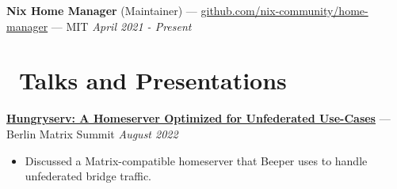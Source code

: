 \documentclass[10pt,letterpaper]{article}
\begin{document}
{\fontsize{11}{0}
\textbf{Nix Home Manager} (Maintainer) ---
\href{https://github.com/nix-community/home-manager}{github.com/nix-community/home-manager} --- MIT}
\hfill \textit{April 2021 - Present}


\section*{\faUsers\ Talks and Presentations}

{\fontsize{11}{0}\href{https://github.com/sumnerevans/hungryserv-presentation}{%
\textbf{Hungryserv: A Homeserver Optimized for Unfederated Use-Cases}}
--- Berlin Matrix Summit}
\hfill \textit{August 2022}
\begin{itemize}
    \item Discussed a Matrix-compatible homeserver that Beeper uses to handle
        unfederated bridge traffic.
\end{itemize}
\end{document}

